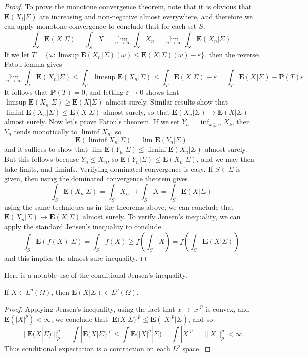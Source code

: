 \begin{proof}
    To prove the monotone convergence theorem, note that it is obvious that $\mathbf{E}(X_i|\Sigma)$ are increasing and non-negative almost everywhere, and therefore we can apply monotone convergence to conclude that for each set $S$,
%
\[ \int_S \mathbf{E}(X|\Sigma) = \int_S X = \lim_{n \to \infty} \int_S X_n = \lim_{n \to \infty} \int_S \mathbf{E}(X_n|\Sigma) \]
%
If we let $T = \{ \omega : \limsup \mathbf{E}(X_n|\Sigma)(\omega) \leq \mathbf{E}(X|\Sigma)(\omega) - \varepsilon \}$, then the reverse Fatou lemma gives
%
\[ \lim_{n \to \infty} \int_T \mathbf{E}(X_n|\Sigma) \leq \int_T \limsup \mathbf{E}(X_n|\Sigma) \leq \int_T \mathbf{E}(X|\Sigma) - \varepsilon = \int_T \mathbf{E}(X|\Sigma) - \mathbf{P}(T) \varepsilon \]
%
It follows that $\mathbf{P}(T) = 0$, and letting $\varepsilon \to 0$ shows that $\limsup \mathbf{E}(X_n|\Sigma) \geq \mathbf{E}(X|\Sigma)$ almost surely. Similar results show that $\liminf \mathbf{E}(X_n|\Sigma) \leq \mathbf{E}(X|\Sigma)$ almost surely, so that $\mathbf{E}(X_n|\Sigma) \to \mathbf{E}(X|\Sigma)$ almost surely. Now let's prove Fatou's theorem. If we set $Y_n = \inf_{k \geq n} X_k$, then $Y_n$ tends monotically to $\liminf X_n$, so
%
\[ \mathbf{E}(\liminf X_n|\Sigma) = \lim \mathbf{E}(Y_n|\Sigma) \]
%
and it suffices to show that $\lim \mathbf{E}(Y_n|\Sigma) \leq \liminf \mathbf{E}(X_n|\Sigma)$ almost surely. But this follows because $Y_n \leq X_n$, so $\mathbf{E}(Y_n|\Sigma) \leq \mathbf{E}(X_n|\Sigma)$, and we may then take limits, and liminfs. Verifying dominated convergence is easy. If $S \in \Sigma$ is given, then using the dominated convergence theorem gives
%
\[ \int_S \mathbf{E}(X_n|\Sigma) = \int_S X_n \to \int_S X = \int_S \mathbf{E}(X|\Sigma) \]
%
using the same techniques as in the theorems above, we can conclude that $\mathbf{E}(X_n|\Sigma) \to \mathbf{E}(X|\Sigma)$ almost surely. To verify Jensen's inequality, we can apply the standard Jensen's inequality to conclude
%
\[ \int_S \mathbf{E}(f(X)|\Sigma) = \int_S f(X) \geq f \left(\int_S X \right) = f \left( \int_S \mathbf{E}(X|\Sigma) \right) \]
%
and this implies the almost sure inequality.
\end{proof}

Here is a notable use of the conditional Jensen's inequality.

\begin{prop}
    If $X \in L^p(\Omega)$, then $\mathbf{E}(X|\Sigma) \in L^p(\Omega)$.
\end{prop}
\begin{proof}
    Applying Jensen's inequality, using the fact that $x \mapsto |x|^p$ is convex, and $\mathbf{E}(|X|^p) < \infty$, we conclude that $|\mathbf{E}(X|\Sigma)|^p \leq \mathbf{E}(|X|^p|\Sigma)$, and so
    \[ \| \mathbf{E}(X|\Sigma) \|_p^p = \int |\mathbf{E}(X|\Sigma)|^p \leq \int \mathbf{E}(|X|^p|\Sigma) = \int |X|^p = \| X \|_p^p < \infty \]
    Thus conditional expectation is a contraction on each $L^p$ space.
\end{proof}

